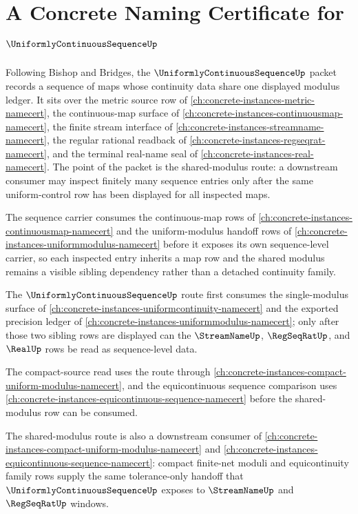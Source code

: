 \chapter{A Concrete Naming Certificate for $\UniformlyContinuousSequenceUp$}
\label{ch:concrete-instances-uniformly-continuous-sequence-namecert}

Following Bishop and Bridges, the $\UniformlyContinuousSequenceUp$ packet records a sequence of maps whose continuity data share one displayed modulus ledger. It sits over the metric source row of \autoref{ch:concrete-instances-metric-namecert}, the continuous-map surface of \autoref{ch:concrete-instances-continuousmap-namecert}, the finite stream interface of \autoref{ch:concrete-instances-streamname-namecert}, the regular rational readback of \autoref{ch:concrete-instances-regseqrat-namecert}, and the terminal real-name seal of \autoref{ch:concrete-instances-real-namecert}. The point of the packet is the shared-modulus route: a downstream consumer may inspect finitely many sequence entries only after the same uniform-control row has been displayed for all inspected maps.

The sequence carrier consumes the continuous-map rows of \autoref{ch:concrete-instances-continuousmap-namecert} and the uniform-modulus handoff rows of \autoref{ch:concrete-instances-uniformmodulus-namecert} before it exposes its own sequence-level carrier, so each inspected entry inherits a map row and the shared modulus remains a visible sibling dependency rather than a detached continuity family.

The $\UniformlyContinuousSequenceUp$ route first consumes the single-modulus surface of \autoref{ch:concrete-instances-uniformcontinuity-namecert} and the exported precision ledger of \autoref{ch:concrete-instances-uniformmodulus-namecert}; only after those two sibling rows are displayed can the $\StreamNameUp$, $\RegSeqRatUp$, and $\RealUp$ rows be read as sequence-level data.

The compact-source read uses the route through \autoref{ch:concrete-instances-compact-uniform-modulus-namecert}, and the equicontinuous sequence comparison uses \autoref{ch:concrete-instances-equicontinuous-sequence-namecert} before the shared-modulus row can be consumed.

The shared-modulus route is also a downstream consumer of \autoref{ch:concrete-instances-compact-uniform-modulus-namecert} and \autoref{ch:concrete-instances-equicontinuous-sequence-namecert}: compact finite-net moduli and equicontinuity family rows supply the same tolerance-only handoff that $\UniformlyContinuousSequenceUp$ exposes to $\StreamNameUp$ and $\RegSeqRatUp$ windows.

